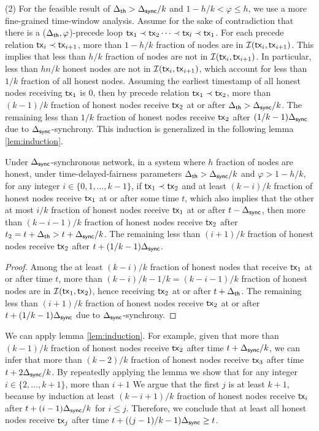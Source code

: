 (2) For the feasible result of $\Delta_{\mathsf{th}} > \Delta_{\mathsf{sync}}/k$ and $1-h/k<\varphi\le h$, we use a more fine-grained time-window analysis. Assume for the sake of contradiction that there is a ($\Delta_{\mathsf{th}}, \varphi$)-precede loop $\mathsf{tx}_1\prec \mathsf{tx}_2\cdots \prec \mathsf{tx}_l \prec \mathsf{tx}_1$. For each precede relation $\mathsf{tx}_i\prec \mathsf{tx}_{i+1}$, more than $1-h/k$ fraction of nodes are in $\mathcal{I}(\mathsf{tx}_{i}, \mathsf{tx}_{i+1})$. This implies that less than $h/k$ fraction of nodes are not in $\mathcal{I}(\mathsf{tx}_{i}, \mathsf{tx}_{i+1})$. In particular, less than $hn/k$ honest nodes are not in $\mathcal{I}(\mathsf{tx}_{i}, \mathsf{tx}_{i+1})$, which account for less than $1/k$ fraction of all honest nodes. Assuming the earliest timestamp of all honest nodes receiving $\mathsf{tx}_1$ is $0$, then by precede relation $\mathsf{tx}_1\prec\mathsf{tx}_2$, more than $(k-1)/k$ fraction of honest nodes receive $\mathsf{tx}_2$ at or after $\Delta_{\mathsf{th}}>\Delta_{\mathsf{sync}}/k$. The remaining less than $1/k$ fraction of honest nodes receive $\mathsf{tx}_2$ after $(1/k-1)\Delta_{\mathsf{sync}}$ due to $\Delta_{\mathsf{sync}}$-synchrony. This induction is generalized in the following lemma \ref{lem:induction}. 

\begin{lemma}\label{lem:induction}
    Under $\Delta_{\mathsf{sync}}$-synchronous network, in a system  where $h$ fraction of nodes are honest, under time-delayed-fairness parameters $\Delta_{\mathsf{th}}>\Delta_{\mathsf{sync}}/k$ and $\varphi > 1-h/k$, for any integer $i\in \{0,1,\dots, k-1\}$, if $\mathsf{tx}_{1}\prec \mathsf{tx}_{2}$ and at least $(k-i)/k$ fraction of honest nodes receive $\mathsf{tx}_1$ at or after some time $t$, which also implies that the other at most $i/k$ fraction of honest nodes receive $\mathsf{tx}_1$ at or after $t-\Delta_{\mathsf{sync}}$, then more than $(k-i-1)/k$ fraction of honest nodes receive $\mathsf{tx}_{2}$ after $t_{2}=t+\Delta_{\mathsf{th}}>t+\Delta_{\mathsf{sync}}/k$. The remaining less than $(i+1)/k$ fraction of honest nodes receive $\mathsf{tx}_{2}$ after $t+(1/k-1)\Delta_{\mathsf{sync}}$.
\end{lemma}

\begin{proof}
    Among the at least $(k-i)/k$ fraction of honest nodes that receive $\mathsf{tx}_1$ at or after time $t$,  more than $(k-i)/k-1/k=(k-i-1)/k$ fraction of honest nodes are in $\mathcal{I}(\mathsf{tx}_1, \mathsf{tx}_2)$, hence receiving $\mathsf{tx}_2$ at or after $t+\Delta_{\mathsf{th}}$. The remaining less than $(i+1)/k$ fraction of honest nodes receive $\mathsf{tx}_2$ at or after $t+(1/k-1)\Delta_{\mathsf{sync}}$ due to $\Delta_{\mathsf{sync}}$-synchrony. 
\end{proof}

We can apply lemma \ref{lem:induction}. For example, given that more than $(k-1)/k$ fraction of honest nodes receive $\mathsf{tx}_2$ after time $t+\Delta_{\mathsf{sync}}/k$, we can infer that more than $(k-2)/k$ fraction of honest nodes receive $\mathsf{tx}_3$ after time $t+2\Delta_{\mathsf{sync}}/k$.  By repeatedly applying the lemma we show that for any integer $i\in \{2,\dots, k+1\}$, more than $i+1$  We argue that the first $j$ is at least $k+1$, because by induction at least $(k-i+1)/k$ fraction of honest nodes receive $\mathsf{tx}_i$ after $t+(i-1)\Delta_{\mathsf{sync}}/k$ for $i\le j$.  Therefore, we conclude that at least all honest nodes receive $\mathsf{tx}_{j}$ after time $t+((j-1)/k-1)\Delta_{\mathsf{sync}}\ge t$. 

